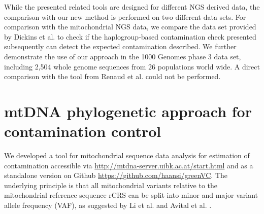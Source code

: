 While the presented related tools are designed for different NGS derived data, the comparison with our new method is performed on two different data sets. For comparison with the mitochondrial NGS data, we compare the data set provided by Dickins et al. \cite{Dickins2014} to check if the haplogroup-based contamination check presented subsequently can detect the expected contamination described. We further demonstrate the use of our approach in the 1000 Genomes phase 3 data set, including 2,504 whole genome sequences from 26 populations world wide. A direct comparison with the tool from Renaud et al. could not be performed.


\section{mtDNA phylogenetic approach for contamination control}\label{haplochecker}
We developed a tool for mitochondrial sequence data analysis for estimation of contamination accessible via \url{http://mtdna-server.uibk.ac.at/start.html} and as a standalone version on Github \url{https://github.com/haansi/greenVC}. The underlying principle is that all mitochondrial variants relative to the mitochondrial reference sequence rCRS \cite{Andrews1999} can be split into minor and major variant allele frequency (VAF), as suggested by Li et al. \cite{Li2010} and Avital et al. \cite{Avital2012}.
